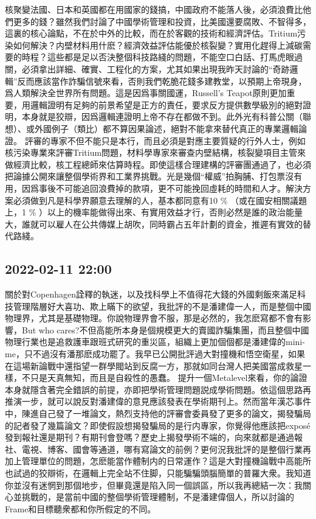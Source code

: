 \documentclass[twocolumn]{ctexart}
\begin{document}
核聚變法國、日本和英國都在用國家的錢搞，中國政府不能落人後，必須浪費比他們更多的錢？雖然我們討論了中國學術管理和投資，比美國還要腐敗、不智得多，這裏的核心論點，不在於中外的比較，而在於客觀的技術和經濟評估。Tritium污染如何解決？内壁材料用什麽？經濟效益評估能優於核裂變？實用化趕得上減碳需要的時程？這些都是足以否決整個科技路綫的問題，不能空口白話、打馬虎眼過關，必須拿出詳細、確實、工程化的方案，尤其如果出現我昨天討論的“奇跡邏輯”反而應該當作詐騙信號來看，否則我們乾脆花錢多建教堂，以預期上帝現身，爲人類解決全世界所有問題。這是因爲事關國運，Russell's Teapot原則更加重要，用邏輯證明有足夠的前景希望是正方的責任，要求反方提供數學級別的絕對證明，本身就是狡辯，因爲邏輯連證明上帝不存在都做不到。此外光有科普公關（聯想）、或外國例子（類比）都不算因果論述，絕對不能拿來替代真正的專業邏輯論證。
評審的專家不但不能只是本行，而且必須是對應主要質疑的行外人士，例如核污染專業來評審Tritium問題，材料學專家來審查内壁結構，核裂變項目主管來做經濟比較，核工程總師來估算時程。即使這樣合理建構的評審團通過了，也必須把論據公開來讓整個學術界和工業界挑戰。光是幾個“權威”拍胸脯、打包票沒有用，因爲事後不可能追回浪費掉的款項，更不可能挽回虛耗的時間和人才。解決方案必須做到凡是科學界願意去理解的人，基本都同意有10 \% （或在國安相關議題上，1 \% ）以上的機率能做得出來、有實用效益才行，否則必然是誰的政治能量大，誰就可以雇人在公共傳媒上胡吹，同時霸占五年計劃的資金，推遲有實效的替代路綫。
\subsection*{2022-02-11 22:00}

關於對Copenhagen詮釋的執迷，以及找科學上不值得花大錢的外國剩飯來滿足科技管理階層好大喜功、欺上瞞下的欲望，我批評的不是潘建偉一人，而是整個中國物理界，尤其是基礎物理。你說物理界會不服，那是必然的，我怎麽寫都不會有影響，But who cares?不但高能所本身是個規模更大的賣國詐騙集團，而且整個中國物理行業也是追救護車跟班式研究的重災區，組織上更加個個都是潘建偉的mini-me，只不過沒有潘那麽成功罷了。我早已公開批評過大對撞機和悟空衛星，如果在這場新論戰中還指望一群學閥站到反腐一方，那就如同台灣人把美國當成救星一樣，不只是天真無知，而且是自殺性的愚蠢。
提升一個Metalevel來看，你的論證本身就隱含著完全錯誤的前提，亦即把學術管理問題説成學術問題。依這個思路再推演一步，就可以說反對潘建偉的意見應該發表在學術期刊上。然而當年漢芯事件中，陳進自己發了一堆論文，熱烈支持他的評審會委員發了更多的論文，揭發騙局的記者發了幾篇論文？即使假設想揭發騙局的是行内專家，你覺得他應該把exposé發到報社還是期刊？有期刊會登嗎？歷史上揭發學術不端的，向來就都是通過報社、電視、博客、國會等通道，哪有寫論文的前例？更何況我批評的是整個行業再加上管理單位的問題，怎麽能當作體制内的日常運作？這是大對撞機論戰中高能所也試過的狡辯術，在邏輯上完全站不住脚，只能騙騙頭腦簡單的普羅大衆。我知道你並沒有迷惘到那個地步，但畢竟還是陷入同一個誤區，所以我再總結一次：我關心並挑戰的，是當前中國的整個學術管理體制，不是潘建偉個人，所以討論的Frame和目標聽衆都和你所假定的不同。
\end{document}
